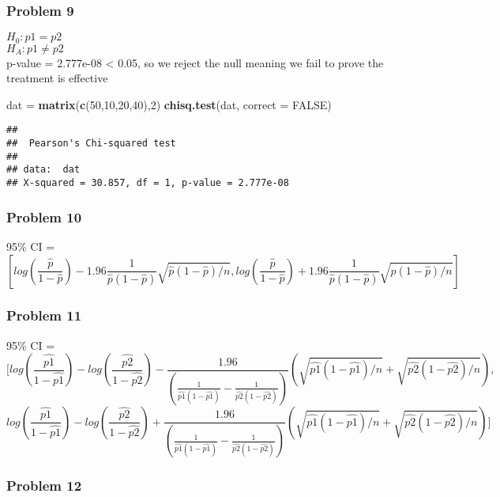 \documentclass[]{article}
\newenvironment{Shaded}{\begin{snugshade}}{\end{snugshade}}
\newcommand{\KeywordTok}[1]{\textcolor[rgb]{0.13,0.29,0.53}{\textbf{#1}}}
\newcommand{\DataTypeTok}[1]{\textcolor[rgb]{0.13,0.29,0.53}{#1}}
\newcommand{\DecValTok}[1]{\textcolor[rgb]{0.00,0.00,0.81}{#1}}
\newcommand{\StringTok}[1]{\textcolor[rgb]{0.31,0.60,0.02}{#1}}
\newcommand{\OtherTok}[1]{\textcolor[rgb]{0.56,0.35,0.01}{#1}}
\newcommand{\NormalTok}[1]{#1}
\begin{document}
\subsubsection{Problem 9}\label{problem-9}

\(H_0 : p1 = p2\)\\
\(H_A : p1\neq p2\)\\
p-value = 2.777e-08 \textless{} 0.05, so we reject the null meaning we
fail to prove the treatment is effective

\begin{Shaded}
\begin{Highlighting}[]
\NormalTok{dat =}\StringTok{ }\KeywordTok{matrix}\NormalTok{(}\KeywordTok{c}\NormalTok{(}\DecValTok{50}\NormalTok{,}\DecValTok{10}\NormalTok{,}\DecValTok{20}\NormalTok{,}\DecValTok{40}\NormalTok{),}\DecValTok{2}\NormalTok{)}
\KeywordTok{chisq.test}\NormalTok{(dat, }\DataTypeTok{correct =} \OtherTok{FALSE}\NormalTok{)}
\end{Highlighting}
\end{Shaded}

\begin{verbatim}
## 
##  Pearson's Chi-squared test
## 
## data:  dat
## X-squared = 30.857, df = 1, p-value = 2.777e-08
\end{verbatim}

\subsubsection{Problem 10}\label{problem-10}

95\% CI =
\[[log(\frac{\hat{p}}{1-\hat{p}})-1.96\frac{1}{\hat{p}(1-\hat{p})}\sqrt{\hat{p}(1-\hat{p})/n},log(\frac{\hat{p}}{1-\hat{p}})+1.96\frac{1}{\hat{p}(1-\hat{p})}\sqrt{\hat{p}(1-\hat{p})/n}]\]

\subsubsection{Problem 11}\label{problem-11}

95\% CI = \[[
log(\frac{\hat{p1}}{1-\hat{p1}})-log(\frac{\hat{p2}}{1-\hat{p2}})-\frac{1.96}{(\frac{1}{\hat{p1}(1-\hat{p1})}-\frac{1}{\hat{p2}(1-\hat{p2})})}(\sqrt{\hat{p1}(1-\hat{p1})/n}+\sqrt{\hat{p2}(1-\hat{p2})/n}),\]
\[
log(\frac{\hat{p1}}{1-\hat{p1}})-log(\frac{\hat{p2}}{1-\hat{p2}})+\frac{1.96}{(\frac{1}{\hat{p1}(1-\hat{p1})}-\frac{1}{\hat{p2}(1-\hat{p2})})}(\sqrt{\hat{p1}(1-\hat{p1})/n}+\sqrt{\hat{p2}(1-\hat{p2})/n})
]\]

\subsubsection{Problem 12}\label{problem-12}
\end{document}
